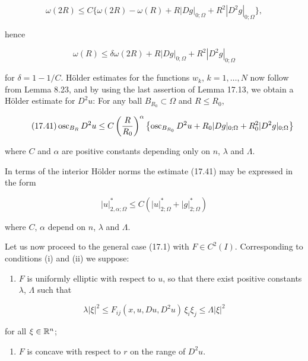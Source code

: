 \[
\omega(2R)\le C\{\omega(2R)-\omega(R)+R|Dg|_{0;\Omega}+R^2|D^2g|_{0;\Omega}\},
\]

hence

\[
\omega(R)\le \delta\omega(2R)+R|Dg|_{0;\Omega}+R^2|D^2g|_{0;\Omega}
\]

for $\delta=1-1/C$. H\"older estimates for the functions $w_k$, $k=1,\ldots,N$ now follow from Lemma 8.23, and by using the last assertion of Lemma 17.13, we obtain a H\"older estimate for $D^2u$: For any ball $B_{R_0}\subset\Omega$ and $R\le R_0$,

\begin{equation}\tag{17.41}
\operatorname{osc}_{B_R}D^2u \le C\left(\frac{R}{R_0}\right)^\alpha
\left\{\operatorname{osc}_{B_{R_0}}D^2u+R_0|Dg|_{0;\Omega}+R_0^2|D^2g|_{0;\Omega}\right\}
\end{equation}

where $C$ and $\alpha$ are positive constants depending only on $n$, $\lambda$ and $\Lambda$.

In terms of the interior H\"older norms the estimate (17.41) may be expressed in the form

\begin{equation}\tag{17.42}
|u|_{2,\alpha;\Omega}^* \le C\left(|u|_{2;\Omega}^*+|g|_{2;\Omega}^*\right)
\end{equation}

where $C$, $\alpha$ depend on $n$, $\lambda$ and $\Lambda$.

Let us now proceed to the general case (17.1) with $F\in C^2(I)$. Corresponding to conditions (i) and (ii) we suppose:

\begin{enumerate}
\item[(i)$'$] $F$ is uniformly elliptic with respect to $u$, so that there exist positive constants $\lambda$, $\Lambda$ such that
\end{enumerate}

\begin{equation}\tag{17.43}
\lambda|\xi|^2\le F_{ij}(x,u,Du,D^2u)\,\xi_i\xi_j\le \Lambda|\xi|^2
\end{equation}

for all $\xi\in\mathbb{R}^n$;

\begin{enumerate}
\item[(ii)] $F$ is concave with respect to $r$ on the range of $D^2u$.
\end{enumerate}



